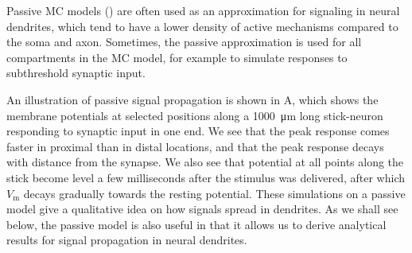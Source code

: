 Passive MC models () are often used as an approximation for signaling in neural dendrites, which tend to have a lower density of active mechanisms compared to the soma and axon. Sometimes, the passive approximation is used for all compartments in the MC model, for example to simulate responses to subthreshold synaptic input. 

An illustration of passive signal propagation is shown in A, which shows the membrane potentials at selected positions along a 1000~\si{\micro\metre} long stick-neuron responding to synaptic input in one end. We see that the peak response comes faster in proximal than in distal locations, and that the peak response decays with distance from the synapse. We also see that potential at all points along the stick become level a few milliseconds after the stimulus was delivered, after which $V_\mathrm{m}$ decays gradually towards the resting potential. These simulations on a passive model give a qualitative idea on how signals spread in dendrites. As we shall see below, the passive model is also useful in that it allows us to derive analytical results for signal propagation in neural dendrites.

